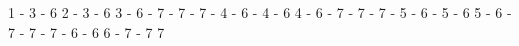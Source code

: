   1 - 3 - 6           2 - 3 - 6               3 - 6
        - 7                 - 7                 - 7
    - 4 - 6             - 4 - 6               4 - 6
        - 7                 - 7                 - 7
    - 5 - 6             - 5 - 6               5 - 6
        - 7                 - 7                 - 7
    - 6                 - 6                   6
    - 7                 - 7                   7
















